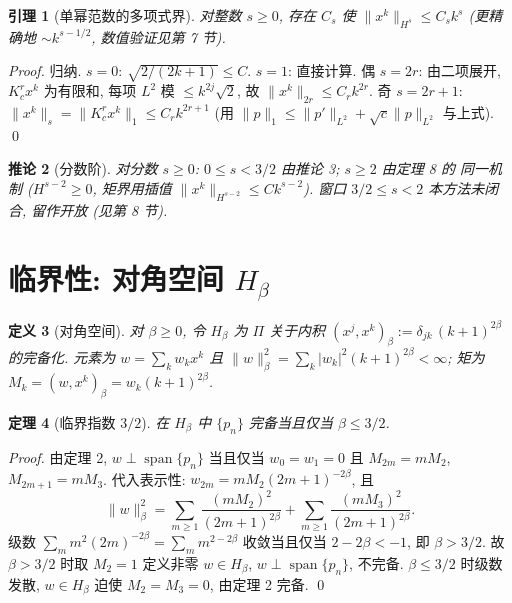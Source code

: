 \documentclass[UTF8]{ctexart}
\newtheorem{theorem}{定理}[section]
\newtheorem{lemma}[theorem]{引理}
\newtheorem{corollary}[theorem]{推论}
\newtheorem{definition}[theorem]{定义}
\begin{document}
\begin{lemma}[单幂范数的多项式界]
	对整数 $s \geq 0$, 存在 $C_s$ 使 $\|x^k\|_{H^s} \leq C_s k^s$
	(更精确地 $\sim k^{s-1/2}$, 数值验证见第 7 节).
\end{lemma}

\begin{proof}
	归纳. $s=0$: $\sqrt{2/(2k+1)} \leq C$. $s=1$: 直接计算.
	偶 $s = 2r$: 由二项展开, $K_c^r x^k$ 为有限和, 每项
	$L^2$ 模 $\leq k^{2j}\sqrt{2}$, 故 $\|x^k\|_{2r} \leq C_r k^{2r}$.
	奇 $s = 2r+1$: $\|x^k\|_s = \|K_c^r x^k\|_1 \leq C_r k^{2r+1}$ (用
	$\|p\|_1 \leq \|p'\|_{L^2} + \sqrt c \|p\|_{L^2}$ 与上式). \qed
\end{proof}

\begin{corollary}[分数阶]
	对分数 $s \geq 0$: $0 \leq s < 3/2$ 由推论 3; $s \geq 2$ 由定理 8 的
	同一机制 ($H^{s-2} \geq 0$, 矩界用插值 $\|x^k\|_{H^{s-2}}
	\leq C k^{s-2}$). 窗口 $3/2 \leq s < 2$ 本方法未闭合, 留作开放
	(见第 8 节).
\end{corollary}

\section{临界性: 对角空间 \texorpdfstring{$H_\beta$}{H beta}}

\begin{definition}[对角空间]
	对 $\beta \geq 0$, 令 $H_\beta$ 为 $\Pi$ 关于内积
	$(x^j, x^k)_\beta := \delta_{jk}\, (k+1)^{2\beta}$ 的完备化. 元素为
	$w = \sum_k w_k x^k$ 且 $\|w\|_\beta^2 = \sum_k |w_k|^2 (k+1)^{2\beta}
	< \infty$; 矩为 $M_k = (w, x^k)_\beta = w_k (k+1)^{2\beta}$.
\end{definition}

\begin{theorem}[临界指数 $3/2$]
	在 $H_\beta$ 中 $\{p_n\}$ 完备当且仅当 $\beta \leq 3/2$.
\end{theorem}

\begin{proof}
	由定理 2, $w \perp \operatorname{span}\{p_n\}$ 当且仅当 $w_0 = w_1 = 0$
	且 $M_{2m} = mM_2$, $M_{2m+1} = mM_3$. 代入表示性:
	$w_{2m} = mM_2 (2m+1)^{-2\beta}$, 且
	\[
		\|w\|_\beta^2 = \sum_{m \geq 1} \frac{(mM_2)^2}{(2m+1)^{2\beta}}
			+ \sum_{m \geq 1} \frac{(mM_3)^2}{(2m+1)^{2\beta}} .
	\]
	级数 $\sum_m m^2 (2m)^{-2\beta} = \sum_m m^{2-2\beta}$ 收敛当且仅当
	$2 - 2\beta < -1$, 即 $\beta > 3/2$. 故 $\beta > 3/2$ 时取 $M_2 = 1$
	定义非零 $w \in H_\beta$, $w \perp \operatorname{span}\{p_n\}$,
	不完备. $\beta \leq 3/2$ 时级数发散, $w \in H_\beta$ 迫使 $M_2 = M_3 = 0$,
	由定理 2 完备. \qed
\end{proof}
\end{document}
